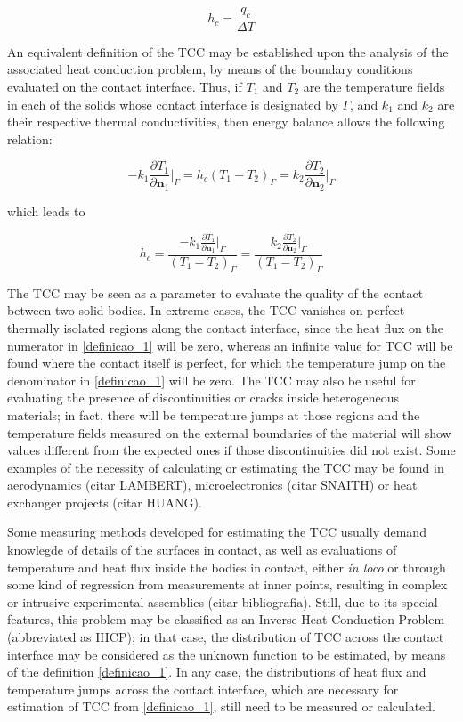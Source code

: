 \documentclass[conference,compsoc]{IEEEtran}
\begin{document}
\begin{equation}
h_c = \frac{q_c}{\Delta T} \label{definicao_1}
\end{equation}

An equivalent definition of the TCC may be established upon the analysis of the associated heat conduction problem, by means of the boundary conditions evaluated on the contact interface. Thus, if $T_1$ and $T_2$ are the temperature fields in each of the solids whose contact interface is designated by $\Gamma$, and  $k_1$ and $k_2$ are their respective thermal conductivities, then energy balance allows the following relation:

\begin{equation}
-k_1\frac{\partial T_1}{\partial \mathbf{n}_1}\bigg|_\Gamma
=
h_c(T_1 - T_2)_\Gamma
=
k_2\frac{\partial T_2}{\partial \mathbf{n}_2}\bigg|_\Gamma \label{definicao_2}
\end{equation}

which leads to

\begin{equation}
h_c = \frac{-k_1\displaystyle\frac{\partial T_1}{\partial \mathbf{n}_1}\bigg|_\Gamma}{(T_1 - T_2)_\Gamma} = \frac{k_2\displaystyle\frac{\partial T_2}{\partial \mathbf{n}_2}\bigg|_\Gamma}{(T_1 - T_2)_\Gamma} \label{eq:definicao_3}
\end{equation}

The TCC may be seen as a parameter to evaluate the quality of the contact between two solid bodies. In extreme cases, the TCC vanishes on perfect thermally isolated regions along the contact interface, since the heat flux on the numerator in \eqref{definicao_1} will be zero, whereas an infinite value for TCC will be found where the contact itself is perfect, for which the temperature jump on the denominator in \eqref{definicao_1} will be zero. The TCC may also be useful for evaluating the presence of discontinuities or cracks inside heterogeneous materials; in fact, there will be temperature jumps at those regions and the temperature fields measured on the external boundaries of the material will show values different from the expected ones if those discontinuities did not exist. Some examples of the necessity of calculating or estimating the TCC may be found in aerodynamics (citar LAMBERT), microelectronics (citar SNAITH) or heat exchanger projects (citar HUANG). 

Some measuring methods developed for estimating the TCC usually demand knowlegde of details of the surfaces in contact, as well as evaluations of temperature and heat flux inside the bodies in contact, either \textit{in loco} or through some kind of regression from measurements at inner points, resulting in complex or intrusive experimental assemblies (citar bibliografia). Still, due to its special features, this problem may be classified as an Inverse Heat Conduction Problem (abbreviated as IHCP); in that case, the distribution of TCC across the contact interface may be considered as the unknown function to be estimated, by means of the definition \eqref{definicao_1}. In any case, the distributions of heat flux and temperature jumps across the contact interface, which are necessary for estimation of TCC from \eqref{definicao_1}, still need to be measured or calculated.
\end{document}
